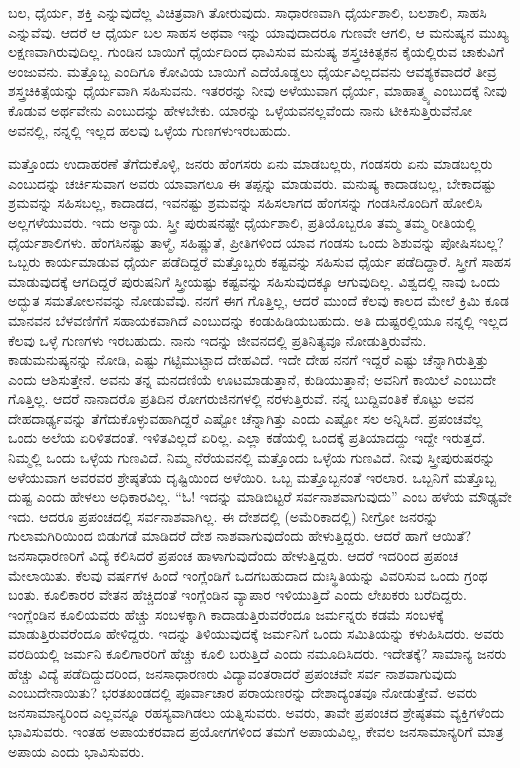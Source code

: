 ಬಲ, ಧೈರ್ಯ, ಶಕ್ತಿ ಎನ್ನುವುದೆಲ್ಲ ವಿಚಿತ್ರವಾಗಿ ತೋರುವುದು. ಸಾಧಾರಣವಾಗಿ ಧೈರ್ಯಶಾಲಿ, ಬಲಶಾಲಿ, ಸಾಹಸಿ ಎನ್ನುವೆವು. ಆದರೆ ಆ ಧೈರ್ಯ ಬಲ ಸಾಹಸ ಅಥವಾ ಇನ್ನು ಯಾವುದಾದರೂ ಗುಣವೇ ಆಗಲಿ, ಆ ಮನುಷ್ಯನ ಮುಖ್ಯ ಲಕ್ಷಣವಾಗಿರುವುದಿಲ್ಲ. ಗುಂಡಿನ ಬಾಯಿಗೆ ಧೈರ್ಯದಿಂದ ಧಾವಿಸುವ ಮನುಷ್ಯ ಶಸ್ತ್ರಚಿಕಿತ್ಸಕನ ಕೈಯಲ್ಲಿರುವ ಚಾಕುವಿಗೆ ಅಂಜುವನು. ಮತ್ತೊಬ್ಬ ಎಂದಿಗೂ ಕೋವಿಯ ಬಾಯಿಗೆ ಎದೆಯೊಡ್ಡಲು ಧೈರ್ಯವಿಲ್ಲದವನು ಆವಶ್ಯಕವಾದರೆ ತೀವ್ರ ಶಸ್ತ್ರಚಿಕಿತ್ಸೆಯನ್ನು ಧೈರ್ಯವಾಗಿ ಸಹಿಸುವನು. ಇತರರನ್ನು ನೀವು ಅಳೆಯುವಾಗ ಧೈರ್ಯ, ಮಾಹಾತ್ಮ್ಯ ಎಂಬುದಕ್ಕೆ ನೀವು ಕೊಡುವ ಅರ್ಥವೇನು ಎಂಬುದನ್ನು ಹೇಳಬೇಕು. ಯಾರನ್ನು ಒಳ್ಳೆಯವನಲ್ಲವೆಂದು ನಾನು ಟೀಕಿಸುತ್ತಿರುವೆನೋ ಅವನಲ್ಲಿ, ನನ್ನಲ್ಲಿ ಇಲ್ಲದ ಹಲವು ಒಳ್ಳೆಯ ಗುಣಗಳು\break ಇರಬಹುದು.

ಮತ್ತೊಂದು ಉದಾಹರಣೆ ತೆಗೆದುಕೊಳ್ಳಿ, ಜನರು ಹೆಂಗಸರು ಏನು ಮಾಡಬಲ್ಲರು, ಗಂಡಸರು ಏನು ಮಾಡಬಲ್ಲರು ಎಂಬುದನ್ನು ಚರ್ಚಿಸುವಾಗ ಅವರು ಯಾವಾಗಲೂ ಈ ತಪ್ಪನ್ನು ಮಾಡುವರು. ಮನುಷ್ಯ ಕಾದಾಡಬಲ್ಲ, ಬೇಕಾದಷ್ಟು ಶ್ರಮವನ್ನು ಸಹಿಸಬಲ್ಲ, ಕಾದಾಡದ, ಇವನಷ್ಟು ಶ್ರಮವನ್ನು ಸಹಿಸಲಾಗದ ಹೆಂಗಸನ್ನು ಗಂಡಸಿನೊಂದಿಗೆ ಹೋಲಿಸಿ ಅಲ್ಲಗಳೆಯುವರು. ಇದು ಅನ್ಯಾಯ. ಸ್ತ್ರೀ ಪುರುಷನಷ್ಟೇ ಧೈರ್ಯಶಾಲಿ, ಪ್ರತಿಯೊಬ್ಬರೂ ತಮ್ಮ ತಮ್ಮ ರೀತಿಯಲ್ಲಿ ಧೈರ್ಯಶಾಲಿಗಳು. ಹೆಂಗಸಿನಷ್ಟು ತಾಳ್ಮೆ, ಸಹಿಷ್ಣುತೆ, ಪ್ರೀತಿಗಳಿಂದ ಯಾವ ಗಂಡಸು ಒಂದು ಶಿಶುವನ್ನು ಪೋಷಿಸಬಲ್ಲ? ಒಬ್ಬರು ಕಾರ್ಯಮಾಡುವ ಧೈರ್ಯ ಪಡೆದಿದ್ದರೆ ಮತ್ತೊಬ್ಬರು ಕಷ್ಟವನ್ನು ಸಹಿಸುವ ಧೈರ್ಯ ಪಡೆದಿದ್ದಾರೆ. ಸ್ತ್ರೀಗೆ ಸಾಹಸ ಮಾಡುವುದಕ್ಕೆ ಆಗದಿದ್ದರೆ ಪುರುಷನಿಗೆ ಸ್ತ್ರೀಯಷ್ಟು ಕಷ್ಟವನ್ನು ಸಹಿಸುವುದಕ್ಕೂ ಆಗುವುದಿಲ್ಲ. ವಿಶ್ವದಲ್ಲಿ ನಾವು ಒಂದು ಅದ್ಭುತ ಸಮತೋಲನವನ್ನು ನೋಡುವೆವು. ನನಗೆ ಈಗ ಗೊತ್ತಿಲ್ಲ, ಆದರೆ ಮುಂದೆ ಕೆಲವು ಕಾಲದ ಮೇಲೆ ಕ್ರಿಮಿ ಕೂಡ ಮಾನವನ ಬೆಳವಣಿಗೆಗೆ ಸಹಾಯಕವಾಗಿದೆ ಎಂಬುದನ್ನು ಕಂಡುಹಿಡಿಯಬಹುದು. ಅತಿ ದುಷ್ಟರಲ್ಲಿಯೂ ನನ್ನಲ್ಲಿ ಇಲ್ಲದ ಕೆಲವು ಒಳ್ಳೆ ಗುಣಗಳು ಇರಬಹುದು. ನಾನು ಇದನ್ನು ಜೀವನದಲ್ಲಿ ಪ್ರತಿನಿತ್ಯವೂ ನೋಡುತ್ತಿರುವೆನು. ಕಾಡುಮನುಷ್ಯನನ್ನು ನೋಡಿ, ಎಷ್ಟು ಗಟ್ಟಿಮುಟ್ಟಾದ ದೇಹವಿದೆ. ಇದೇ ದೇಹ ನನಗೆ ಇದ್ದರೆ ಎಷ್ಟು ಚೆನ್ನಾಗಿರುತ್ತಿತ್ತು ಎಂದು ಆಶಿಸುತ್ತೇನೆ. ಅವನು ತನ್ನ ಮನದಣಿಯೆ ಊಟಮಾಡುತ್ತಾನೆ, ಕುಡಿಯುತ್ತಾನೆ; ಅವನಿಗೆ ಕಾಯಿಲೆ ಎಂಬುದೇ ಗೊತ್ತಿಲ್ಲ. ಆದರೆ ನಾನಾದರೊ ಪ್ರತಿದಿನ ರೋಗರುಜಿನಗಳಲ್ಲಿ ನರಳುತ್ತಿರುವೆ. ನನ್ನ ಬುದ್ದಿವಂತಿಕೆ ಕೊಟ್ಟು ಅವನ ದೇಹದಾರ್ಢ್ಯವನ್ನು ತೆಗೆದುಕೊಳ್ಳುವಹಾಗಿದ್ದರೆ ಎಷ್ಟೋ ಚೆನ್ನಾಗಿತ್ತು ಎಂದು ಎಷ್ಟೋ ಸಲ ಅನ್ನಿಸಿದೆ. ಪ್ರಪಂಚವೆಲ್ಲ ಒಂದು ಅಲೆಯ ಏರಿಳಿತದಂತೆ. ಇಳಿತವಿಲ್ಲದೆ ಏರಿಲ್ಲ. ಎಲ್ಲಾ ಕಡೆಯಲ್ಲಿ ಒಂದಕ್ಕೆ ಪ್ರತಿಯಾದದ್ದು ಇದ್ದೇ ಇರುತ್ತದೆ. ನಿಮ್ಮಲ್ಲಿ ಒಂದು ಒಳ್ಳೆಯ ಗುಣವಿದೆ. ನಿಮ್ಮ ನೆರೆಯವನಲ್ಲಿ ಮತ್ತೊಂದು ಒಳ್ಳೆಯ ಗುಣವಿದೆ. ನೀವು ಸ್ತ್ರೀಪುರುಷರನ್ನು ಅಳೆಯುವಾಗ ಅವರವರ ಶ್ರೇಷ್ಠತೆಯ ದೃಷ್ಟಿಯಿಂದ ಅಳೆಯಿರಿ. ಒಬ್ಬ ಮತ್ತೊಬ್ಬನಂತೆ ಇರಲಾರ. ಒಬ್ಬನಿಗೆ ಮತ್ತೊಬ್ಬ ದುಷ್ಟ ಎಂದು ಹೇಳಲು ಅಧಿಕಾರವಿಲ್ಲ. “ಓ! ಇದನ್ನು ಮಾಡಿಬಿಟ್ಟರೆ ಸರ್ವನಾಶವಾಗುವುದು'' ಎಂಬ ಹಳೆಯ ಮೌಢ್ಯವೇ ಇದು. ಆದರೂ ಪ್ರಪಂಚದಲ್ಲಿ ಸರ್ವನಾಶವಾಗಿಲ್ಲ. ಈ ದೇಶದಲ್ಲಿ (ಅಮೆರಿಕಾದಲ್ಲಿ) ನೀಗ್ರೋ ಜನರನ್ನು ಗುಲಾಮಗಿರಿಯಿಂದ ಬಿಡುಗಡೆ ಮಾಡಿದರೆ ದೇಶ ನಾಶವಾಗುವುದೆಂದು ಹೇಳುತ್ತಿದ್ದರು. ಆದರೆ ಹಾಗೆ ಆಯಿತೆ? ಜನಸಾಧಾರಣರಿಗೆ ವಿದ್ಯೆ ಕಲಿಸಿದರೆ ಪ್ರಪಂಚ ಹಾಳಾಗುವುದೆಂದು ಹೇಳುತ್ತಿದ್ದರು. ಆದರೆ ಇದರಿಂದ ಪ್ರಪಂಚ ಮೇಲಾಯಿತು. ಕೆಲವು ವರ್ಷಗಳ ಹಿಂದೆ ಇಂಗ್ಲೆಂಡಿಗೆ ಒದಗಬಹುದಾದ ದುಃಸ್ಥಿತಿಯನ್ನು ವಿವರಿಸುವ ಒಂದು ಗ್ರಂಥ ಬಂತು. ಕೂಲಿಕಾರರ ವೇತನ ಹೆಚ್ಚಿದಂತೆ ಇಂಗ್ಲೆಂಡಿನ ವ್ಯಾಪಾರ ಇಳಿಯುತ್ತಿದೆ ಎಂದು ಲೇಖಕರು ಬರೆದಿದ್ದರು. ಇಂಗ್ಲೆಂಡಿನ ಕೂಲಿಯವರು ಹೆಚ್ಚು ಸಂಬಳಕ್ಕಾಗಿ ಕಾದಾಡುತ್ತಿರುವರೆಂದೂ ಜರ್ಮನ್ನರು ಕಡಮೆ ಸಂಬಳಕ್ಕೆ ಮಾಡುತ್ತಿರುವರೆಂದೂ ಹೇಳಿದ್ದರು. ಇದನ್ನು ತಿಳಿಯುವುದಕ್ಕೆ ಜರ್ಮನಿಗೆ ಒಂದು ಸಮಿತಿಯನ್ನು ಕಳುಹಿಸಿದರು. ಅವರು ವರದಿಯಲ್ಲಿ ಜರ್ಮನಿ ಕೂಲಿಗಾರರಿಗೆ ಹೆಚ್ಚು ಕೂಲಿ ಬರುತ್ತಿದೆ ಎಂದು ನಮೂದಿಸಿದರು. ಇದೇತಕ್ಕೆ? ಸಾಮಾನ್ಯ ಜನರು ಹೆಚ್ಚು ವಿದ್ಯೆ ಪಡೆದಿದ್ದುದರಿಂದ, ಜನಸಾಧಾರಣರು ವಿದ್ಯಾವಂತರಾದರೆ ಪ್ರಪಂಚವೇ ಸರ್ವ ನಾಶವಾಗುವುದು ಎಂಬುದೇನಾಯಿತು? ಭರತಖಂಡದಲ್ಲಿ ಪೂರ್ವಾಚಾರ ಪರಾಯಣರನ್ನು ದೇಶಾದ್ಯಂತವೂ ನೋಡುತ್ತೇವೆ. ಅವರು ಜನಸಾಮಾನ್ಯರಿಂದ ಎಲ್ಲವನ್ನೂ ರಹಸ್ಯವಾಗಿಡಲು ಯತ್ನಿಸುವರು. ಅವರು, ತಾವೇ ಪ್ರಪಂಚದ ಶ್ರೇಷ್ಠತಮ ವ್ಯಕ್ತಿಗಳೆಂದು ಭಾವಿಸುವರು. ಇಂತಹ ಅಪಾಯಕರವಾದ ಪ್ರಯೋಗಗಳಿಂದ ತಮಗೆ ಅಪಾಯವಿಲ್ಲ, ಕೇವಲ ಜನಸಾಮಾನ್ಯರಿಗೆ ಮಾತ್ರ ಅಪಾಯ ಎಂದು ಭಾವಿಸುವರು.

